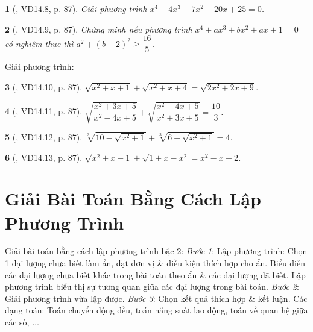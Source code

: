 \documentclass{article}
\newtheorem{baitoan}{}
\begin{document}
\begin{baitoan}[\cite{TLCT_THCS_Toan_9_dai_so}, VD14.8, p. 87]
	Giải phương trình $x^4 + 4x^3 - 7x^2 - 20x + 25 = 0$.
\end{baitoan}

\begin{baitoan}[\cite{TLCT_THCS_Toan_9_dai_so}, VD14.9, p. 87]
	Chứng minh nếu phương trình $x^4 + ax^3 + bx^2 + ax + 1 = 0$ có nghiệm thực thì $a^2 + (b - 2)^2\ge\dfrac{16}{5}$.
\end{baitoan}
Giải phương trình:
	
\begin{baitoan}[\cite{TLCT_THCS_Toan_9_dai_so}, VD14.10, p. 87]
	$\sqrt{x^2 + x + 1} + \sqrt{x^2 + x + 4} = \sqrt{2x^2 + 2x + 9}$.
\end{baitoan}

\begin{baitoan}[\cite{TLCT_THCS_Toan_9_dai_so}, VD14.11, p. 87]
	$\sqrt{\dfrac{x^2 + 3x + 5}{x^2 - 4x + 5}} + \sqrt{\dfrac{x^2 - 4x + 5}{x^2 + 3x + 5}} = \dfrac{10}{3}$.
\end{baitoan}

\begin{baitoan}[\cite{TLCT_THCS_Toan_9_dai_so}, VD14.12, p. 87]
	$\sqrt[3]{10 - \sqrt{x^2 + 1}} + \sqrt[3]{6 + \sqrt{x^2 + 1}} = 4$.
\end{baitoan}

\begin{baitoan}[\cite{TLCT_THCS_Toan_9_dai_so}, VD14.13, p. 87]
	$\sqrt{x^2 + x - 1} + \sqrt{1 + x - x^2} = x^2 - x + 2$.
\end{baitoan}


\section{Giải Bài Toán Bằng Cách Lập Phương Trình}
 {\sf Giải bài toán bằng cách lập phương trình bậc 2}: \textit{Bước 1}: Lập phương trình: Chọn 1 đại lượng chưa biết làm ẩn, đặt đơn vị \& điều kiện thích hợp cho ẩn. Biểu diễn các đại lượng chưa biết khác trong bài toán theo ẩn \& các đại lượng đã biết. Lập phương trình biểu thị sự tương quan giữa các đại lượng trong bài toán. \textit{Bước 2}: Giải phương trình vừa lập được. \textit{Bước 3}: Chọn kết quả thích hợp \& kết luận.  Các dạng toán: Toán chuyển động đều, toán năng suất lao động, toán về quan hệ giữa các số, $\ldots$
\end{document}
